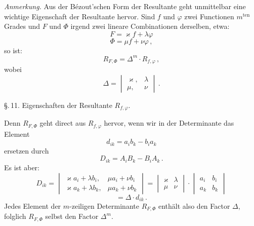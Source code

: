 \textit{Anmerkung.} Aus der B\'ezout'schen Form der Resultante geht
unmittelbar eine wichtige Eigenschaft der Resultante hervor. Sind $f$
und $\varphi$ zwei Functionen $m^{\mathrm{ten}}$ Grades und $F$ und $\Phi$
irgend zwei lineare Combinationen derselben, etwa:
\[
F = \varkappa f + \lambda \varphi
\]
\[
\Phi = \mu f + \nu \varphi\,,
\]
so ist:
\[
R_{F,\Phi} = \Delta^m \cdot R_{f,\varphi}\,,
\]
wobei
\[
\Delta = \begin{vmatrix} \varkappa, & \lambda \\ \mu, & \nu \end{vmatrix}\,.
\]


\S.\,11. Eigenschaften der Resultante $R_{f,\varphi}$.

Denn $R_{F,\Phi}$ geht direct aus $R_{f,\varphi}$ hervor, wenn wir in der
Determinante das Element
\[
d_{ik} = a_i b_k - b_i a_k
\]
ersetzen durch
\[
D_{ik} = A_i B_k - B_i A_k\,.
\]
Es ist aber:
\[
D_{ik} = \begin{vmatrix} \varkappa a_i + \lambda b_i, & \mu a_i + \nu b_i \\ \varkappa a_k + \lambda b_k, & \mu a_k + \nu b_k \end{vmatrix}
= \begin{vmatrix} \varkappa & \lambda \\ \mu & \nu \end{vmatrix} \cdot \begin{vmatrix} a_i & b_i \\ a_k & b_k \end{vmatrix}
\]
\[
= \Delta \cdot d_{ik}\,.
\]
Jedes Element der $m$-zeiligen Determinante $R_{F,\Phi}$ enth\"alt also
den Factor $\Delta$, folglich $R_{F,\Phi}$ selbst den Factor $\Delta^m$.

